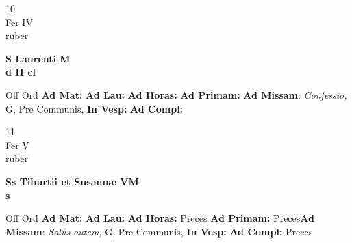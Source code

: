 \documentclass[10pt, openany]{book}
\begin{document}
    \begin{center}
        \begin{minipage}{3.5in}
            \vspace{2em}
            \begin{minipage}{0.5in}
                {\Huge 10} \\
                {\normalsize Fer IV} \\
                {\normalsize ruber}
            \end{minipage}
            \begin{minipage}{3.0in}
                \textbf{ \large S Laurenti M \\
                \textnormal{\normalsize d II cl}} \\ 
            \end{minipage}
            \begin{justify}Off Ord
                \textbf{Ad Mat: }
                \textbf{Ad Lau: }
                \textbf{Ad Horas: }
                \textbf{Ad Primam: }\textbf{Ad Missam}: \textit{Confessio,} G, Pre Communis,  
                \textbf{In Vesp: }
                \textbf{Ad Compl: }
            \end{justify}
        \end{minipage}
    \end{center}

    \begin{center}
        \begin{minipage}{3.5in}
            \vspace{2em}
            \begin{minipage}{0.5in}
                {\Huge 11} \\
                {\normalsize Fer V} \\
                {\normalsize ruber}
            \end{minipage}
            \begin{minipage}{3.0in}
                \textbf{ \large Ss Tiburtii et Susannæ VM \\
                \textnormal{\normalsize s}} \\ 
            \end{minipage}
            \begin{justify}Off Ord
                \textbf{Ad Mat: }
                \textbf{Ad Lau: }
                \textbf{Ad Horas: }Preces
                \textbf{Ad Primam: }Preces\textbf{Ad Missam}: \textit{Salus autem,} G, Pre Communis,  
                \textbf{In Vesp: }
                \textbf{Ad Compl: }Preces
            \end{justify}
        \end{minipage}
    \end{center}
\end{document}

